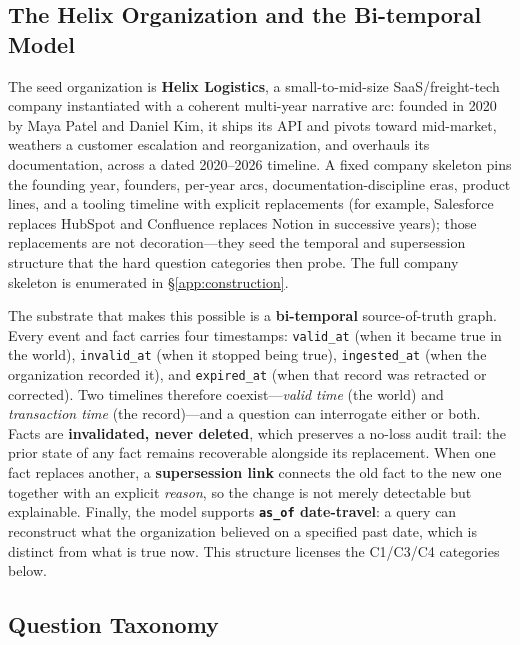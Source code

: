 \subsection{The Helix Organization and the Bi-temporal Model}
\label{sec:design:helix}

The seed organization is \textbf{Helix Logistics}, a small-to-mid-size
SaaS/freight-tech company instantiated with a coherent multi-year narrative arc:
founded in 2020 by Maya Patel and Daniel Kim, it ships its API and pivots toward
mid-market, weathers a customer escalation and reorganization, and overhauls its
documentation, across a dated 2020--2026 timeline. A fixed company skeleton pins
the founding year, founders, per-year arcs, documentation-discipline eras,
product lines, and a tooling timeline with explicit replacements (for example,
Salesforce replaces HubSpot and Confluence replaces Notion in successive years);
those replacements are not decoration---they seed the temporal and supersession
structure that the hard question categories then probe. The full company
skeleton is enumerated in \S\ref{app:construction}.

The substrate that makes this possible is a \textbf{bi-temporal}
source-of-truth graph. Every event and fact carries four timestamps:
\texttt{valid\_at} (when it became true in the world), \texttt{invalid\_at}
(when it stopped being true), \texttt{ingested\_at} (when the organization
recorded it), and \texttt{expired\_at} (when that record was retracted or
corrected). Two timelines therefore coexist---\emph{valid time} (the world) and
\emph{transaction time} (the record)---and a question can interrogate either or
both. Facts are \textbf{invalidated, never deleted}, which preserves a no-loss
audit trail: the prior state of any fact remains recoverable alongside its
replacement. When one fact replaces another, a \textbf{supersession link}
connects the old fact to the new one together with an explicit \emph{reason}, so
the change is not merely detectable but explainable. Finally, the model supports
\textbf{\texttt{as\_of} date-travel}: a query can reconstruct what the
organization believed on a specified past date, which is distinct from what is
true now. This structure licenses the C1/C3/C4 categories below.

\subsection{Question Taxonomy}
\label{sec:design:taxonomy}
\label{sec:design:questions}

